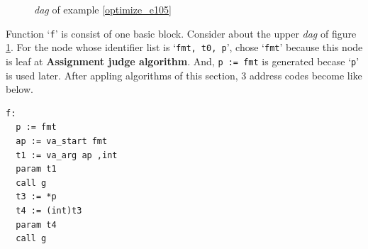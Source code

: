 \begin{Example}
\begin{figure}[htbp]
\begin{center}
\caption{{\em dag} of example \ref{optimize_e105}}
\label{optimize_e106}
\end{center}
\end{figure}
Function `{\tt{f}}' is consist of one basic block. Consider about
the upper {\em dag} of figure \ref{optimize_e106}.
For the node whose identifier list is `{\tt{fmt, t0, p}}',
chose `{\tt{fmt}}' because this node is leaf
at {\bf Assignment judge algorithm}.
And, {\tt{p := fmt}} is generated becase `{\tt{p}}' is used later.
After appling algorithms of this section,
3 address codes become like below.
\begin{verbatim}
f:
  p := fmt
  ap := va_start fmt
  t1 := va_arg ap ,int
  param t1
  call g
  t3 := *p
  t4 := (int)t3
  param t4
  call g
\end{verbatim}
\end{Example}
